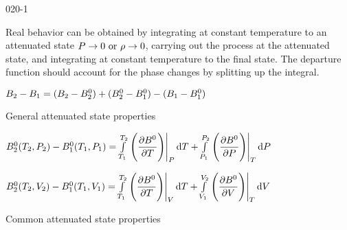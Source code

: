 \begin{mitframe}{020-1} 

    
	\begin{listone}
	
    \item Real behavior can be obtained by integrating at constant temperature to an attenuated state $\p \rightarrow 0 ~\text{or}~ \dens \rightarrow 0$, carrying out the process at the attenuated state, and integrating at constant temperature to the final state. The departure function should account for the phase changes by splitting up the integral.
    
    \item $\virialcoeff{2}-\virialcoeff{1}=(\virialcoeff{2}-\virialcoeff{2}^{\init})+(\virialcoeff{2}^{\init}-\virialcoeff{1}^{\init})-(\virialcoeff{1}-\virialcoeff{1}^{\init})$
    
    \item General attenuated state properties
    
    \begin{listtwo}

		\item $\virialcoeff{2}^{\init}(\Temp_{2},\p_{2})-\virialcoeff{1}^{\init}(\Temp_{1},\p_{1})=\int\limits_{\Temp_{1}}^{\Temp_{2}}\left.\Bigg(\dfrac{\partial\virialcoeff{}^{\init}}{\partial\Temp}\Bigg)\right|_{\p}\mathrm{d}\Temp+\int\limits_{\p_{1}}^{\p_{2}}\left.\Bigg(\dfrac{\partial\virialcoeff{}^{\init}}{\partial\p}\Bigg)\right|_{\Temp}\mathrm{d}\p$
        
        \item $\virialcoeff{2}^{\init}(\Temp_{2},\vol_{2})-\virialcoeff{1}^{\init}(\Temp_{1},\vol_{1})=\int\limits_{\Temp_{1}}^{\Temp_{2}}\left.\Bigg(\dfrac{\partial\virialcoeff{}^{\init}}{\partial\Temp}\Bigg)\right|_{\vol}\mathrm{d}\Temp+\int\limits_{\vol_{1}}^{\vol_{2}}\left.\Bigg(\dfrac{\partial\virialcoeff{}^{\init}}{\partial\vol}\Bigg)\right|_{\Temp}\mathrm{d}\vol$

	\end{listtwo}    
    
    \item Common attenuated state properties
    
    \begin{listtwo}


\end{listtwo}
\end{listone}
\end{mitframe}
